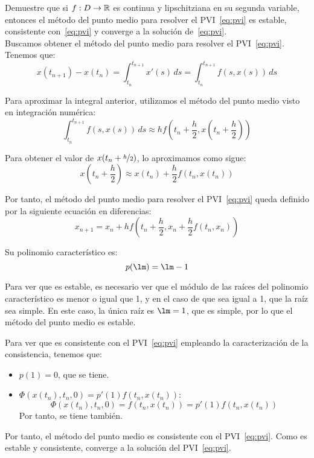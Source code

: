 \begin{ejercicio}\label{ej:3.1.3}
    Demuestre que si $f : D \to \mathbb{R}$ es continua y lipschitziana en su segunda variable, entonces el método del punto medio para resolver el PVI~\eqref{eq:pvi} es estable, consistente con~\eqref{eq:pvi} y converge a la solución de~\eqref{eq:pvi}.\\

    Buscamos obtener el método del punto medio para resolver el PVI~\eqref{eq:pvi}. Tenemos que:
    \begin{equation*}
        x(t_{n+1})-x(t_n) = \int_{t_n}^{t_{n+1}} x'(s)\, ds = \int_{t_n}^{t_{n+1}} f(s, x(s))\, ds
    \end{equation*}

    Para aproximar la integral anterior, utilizamos el método del punto medio visto en integración numérica:
    \begin{equation*}
        \int_{t_n}^{t_{n+1}} f(s, x(s))\, ds \approx h f\left(t_n + \frac{h}{2}, x\left(t_n + \frac{h}{2}\right)\right)
    \end{equation*}

    Para obtener el valor de $x(t_n + \nicefrac{h}{2})$, lo aproximamos como sigue:
    \begin{equation*}
        x\left(t_n + \frac{h}{2}\right) \approx x(t_n) + \frac{h}{2} f(t_n, x(t_n))
    \end{equation*}

    Por tanto, el método del punto medio para resolver el PVI~\eqref{eq:pvi} queda definido por la siguiente ecuación en diferencias:
    \begin{equation*}
        x_{n+1} = x_n + h f\left(t_n + \frac{h}{2}, x_n + \frac{h}{2} f(t_n, x_n)\right)
    \end{equation*}

    Su polinomio característico es:
    \begin{equation*}
        p(\lm) = \lm -1
    \end{equation*}

    Para ver que es estable, es necesario ver que el módulo de las raíces del polinomio característico es menor o igual que 1, y en el caso de que sea igual a 1, que la raíz sea simple. En este caso, la única raíz es $\lm = 1$, que es simple, por lo que el método del punto medio es estable.

    Para ver que es consistente con el PVI~\eqref{eq:pvi} empleando la caracterización de la consistencia, tenemos que:
    \begin{itemize}
        \item $p(1)= 0$, que se tiene.
        \item $\Phi(x(t_n), t_n, 0)=p'(1)f(t_n, x(t_n))$:
        \begin{equation*}
            \Phi(x(t_n), t_n, 0) = f\left(t_n, x(t_n)\right) = p'(1) f(t_n, x(t_n))
        \end{equation*}
        Por tanto, se tiene también.
    \end{itemize}
    
    Por tanto, el método del punto medio es consistente con el PVI~\eqref{eq:pvi}. Como es estable y consistente, converge a la solución del PVI~\eqref{eq:pvi}.
\end{ejercicio}

